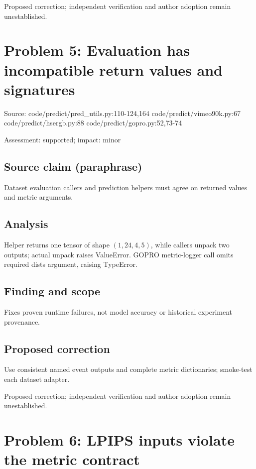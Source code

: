 \documentclass[11pt]{article}
\begin{document}
Proposed correction; independent verification and author adoption remain unestablished.

\section*{Problem 5: Evaluation has incompatible return values and signatures}

Source: code/predict/pred\_utils.py:110-124,164 code/predict/vimeo90k.py:67 code/predict/hsergb.py:88 code/predict/gopro.py:52,73-74

Assessment: supported; impact: minor

\subsection*{Source claim (paraphrase)}

Dataset evaluation callers and prediction helpers must agree on returned values and metric arguments.

\subsection*{Analysis}

Helper returns one tensor of shape \((1,24,4,5)\), while callers unpack two outputs; actual unpack raises ValueError. GOPRO metric-logger call omits required dists argument, raising TypeError.

\subsection*{Finding and scope}

Fixes proven runtime failures, not model accuracy or historical experiment provenance.

\subsection*{Proposed correction}

Use consistent named event outputs and complete metric dictionaries; smoke-test each dataset adapter.

Proposed correction; independent verification and author adoption remain unestablished.

\section*{Problem 6: LPIPS inputs violate the metric contract}
\end{document}
